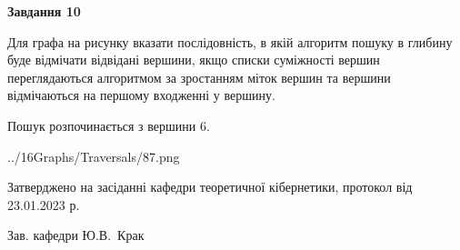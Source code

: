 \documentclass[12pt, ukrainian]{article}
\begin{document}
{\begin {large}
{\begin {center}\textbf{Завдання 10}\end {center}}\par
Для графа на рисунку вказати послідовність, в якій алгоритм пошуку в глибину буде відмічати відвідані вершини, якщо списки суміжності вершин переглядаються алгоритмом за зростанням міток вершин та вершини відмічаються на першому вход\-женні у вершину.\par
Пошук розпочинається з вершини 6.\par

\begin{center}
	{../16Graphs/Traversals/87.png}
\end{center}\par
\newpage


\end {large}
}
{\smallskip \begin {small} Затверджено на засіданні кафедри теоретичної кібернетики, протокол  від   23.01.2023 р.\par\smallskip\smallskip
{\parbox {6.5 cm}{Зав. кафедри \dotfill Ю.В.~Крак}} \end{small}}
\end{document}
